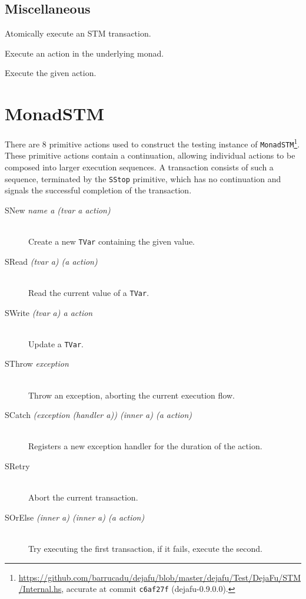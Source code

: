\subsection{Miscellaneous}

\begin{description}
  Atomically execute an STM transaction.

  Execute an action in the underlying monad.

  Execute the given action.
\end{description}

\section{MonadSTM}
\label{app:primops-stm}

\renewcommand{\defineprim}[2]{\item[#1 \textit{#2}] \hfill \\}

There are 8 primitive actions used to construct the testing instance of
\verb|MonadSTM|\footnote{\url{https://github.com/barrucadu/dejafu/blob/master/dejafu/Test/DejaFu/STM/Internal.hs},
  accurate at commit \texttt{c6af27f} (dejafu-0.9.0.0).}.  These primitive
actions contain a continuation, allowing individual actions to be composed into
larger execution sequences.  A transaction consists of such a sequence,
terminated by the \verb|SStop| primitive, which has no continuation and signals
the successful completion of the transaction.

\begin{description}
\defineprim{SNew}{name a (tvar a \arr action)}
  Create a new \verb|TVar| containing the given value.

\defineprim{SRead}{(tvar a) (a \arr action)}
  Read the current value of a \verb|TVar|.

\defineprim{SWrite}{(tvar a) a action}
  Update a \verb|TVar|.

\defineprim{SThrow}{exception}
  Throw an exception, aborting the current execution flow.

\defineprim{SCatch}{(exception \arr (handler a)) (inner a) (a \arr action)}
  Registers a new exception handler for the duration of the action.

\defineprim{SRetry}{}
  Abort the current transaction.

\defineprim{SOrElse}{(inner a) (inner a) (a \arr action)}
  Try executing the first transaction, if it fails, execute the
  second.
\end{description}
